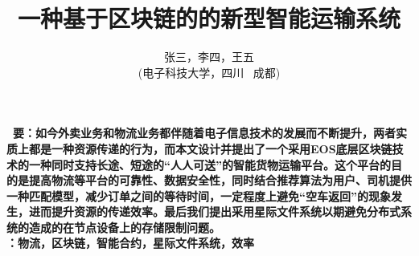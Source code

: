 \documentclass[UTF8]{ctexart}
\title{\textbf{一种基于区块链的的新型智能运输系统}}
\author{\sffamily 张三，李四，王五\\ \sffamily(电子科技大学，四川 \ 成都)}
\date{}
\begin{document}
  \maketitle
  \textbf{ \ 要：\heiti  \small 如今外卖业务和物流业务都伴随着电子信息技术的发展而不断提升，两者实质上都是一种资源传递的行为，而本文设计并提出了一个采用EOS底层区块链技术的一种同时支持长途、短途的“人人可送”的智能货物运输平台。这个平台的目的是提高物流等平台的可靠性、数据安全性，同时结合推荐算法为用户、司机提供一种匹配模型，减少订单之间的等待时间，一定程度上避免“空车返回”的现象发生，进而提升资源的传递效率。最后我们提出采用星际文件系统以期避免分布式系统的造成的在节点设备上的存储限制问题。}
  \\
  \indent \textbf{：\heiti  \small 物流，区块链，智能合约，星际文件系统，效率}
  \pagestyle{plain}	%
  \\
  \\




\end{document}
